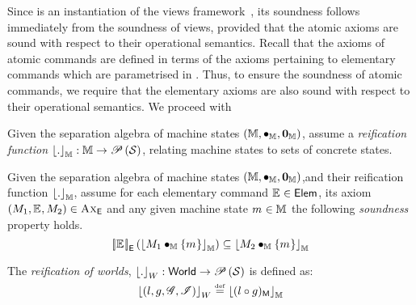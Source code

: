 Since \colosl is an instantiation of the views framework~\cite{views}, its soundness follows immediately from the soundness of views, provided that the atomic axioms are sound with respect to their operational semantics. Recall that the axioms of atomic commands are defined in terms of the axioms pertaining to elementary commands which are parametrised in \colosl. Thus, to ensure the soundness of atomic commands, we require that the elementary axioms are also sound with respect to their operational semantics. We proceed with 

\begin{parameter}
%
Given the separation algebra of machine states $(\mathbb{M}, \bullet_{\mathbb{M}}, \mathbf{0}_{\mathbb{M}})$, assume a \emph{reification function} $\left\lfloor . \right\rfloor_{\mathbb{M}}: \mathbb{M} \rightarrow \mathscr{P}\left(\mathcal{S} \right)$, relating machine states to sets of concrete states. 
\end{parameter}
%
\begin{parameter}\label{param:elementary-soundness}
Given the separation algebra of machine states $(\mathbb{M}, \bullet_{\mathbb{M}}, \mathbf{0}_{\mathbb{M}})$,and their reification function $\left\lfloor . \right\rfloor_{\mathbb{M}}$, assume for each elementary command $\mathbb{E}_{} \in \textsf{Elem}$, its axiom $\left(M_1, \mathbb{E}_{}, M_2\right) \in \textsc{Ax}_{\textsf{E}}$ and any given machine state $m_{} \in \mathbb{M}$ the following \emph{soundness} property holds.
%
\[
	\left[\!\left| \mathbb{E}_{} \right |\! \right]_{\textsf{E}}\left( \left\lfloor M_1 \bullet_{\mathbb{M}} \{m_{}\} \right\rfloor_{\mathbb{M}} \right) \subseteq  \left\lfloor M_2 \bullet_{\mathbb{M}} \{m_{}\} \right\rfloor_{\mathbb{M}}
\]
%
\end{parameter}
%
%
%
\begin{definition}[Reification]\label{def:reification}
The \emph{reification of worlds}, $\left\lfloor . \right\rfloor_{W}: \textsf{World} \rightarrow \mathscr{P}\left(\mathcal{S} \right)$ is defined as:
%
\[
	\left\lfloor (l, g, \mathscr{G}, \mathscr{I}) \right\rfloor_{W} \mathrel{\stackrel{\smash{\scriptscriptstyle{\mathrm{def}}}}{=}} \left\lfloor (l \circ g)_{\textsf{M}} \right\rfloor_{\mathbb{M}}
\]
%
\end{definition}
%
